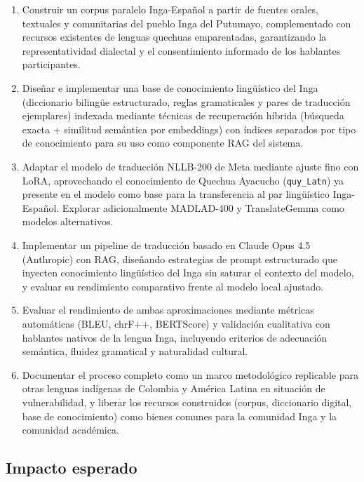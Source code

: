 \documentclass[12pt,a4paper]{article}
\begin{document}
\begin{enumerate}
    \item Construir un corpus paralelo Inga-Español a partir de fuentes orales, textuales y comunitarias del pueblo Inga del Putumayo, complementado con recursos existentes de lenguas quechuas emparentadas, garantizando la representatividad dialectal y el consentimiento informado de los hablantes participantes.

    \item Diseñar e implementar una base de conocimiento lingüístico del Inga (diccionario bilingüe estructurado, reglas gramaticales y pares de traducción ejemplares) indexada mediante técnicas de recuperación híbrida (búsqueda exacta + similitud semántica por embeddings) con índices separados por tipo de conocimiento para su uso como componente RAG del sistema.

    \item Adaptar el modelo de traducción NLLB-200 de Meta mediante ajuste fino con LoRA, aprovechando el conocimiento de Quechua Ayacucho (\texttt{quy\_Latn}) ya presente en el modelo como base para la transferencia al par lingüístico Inga-Español. Explorar adicionalmente MADLAD-400 y TranslateGemma como modelos alternativos.

    \item Implementar un pipeline de traducción basado en Claude Opus 4.5 (Anthropic) con RAG, diseñando estrategias de prompt estructurado que inyecten conocimiento lingüístico del Inga sin saturar el contexto del modelo, y evaluar su rendimiento comparativo frente al modelo local ajustado.

    \item Evaluar el rendimiento de ambas aproximaciones mediante métricas automáticas (BLEU, chrF++, BERTScore) y validación cualitativa con hablantes nativos de la lengua Inga, incluyendo criterios de adecuación semántica, fluidez gramatical y naturalidad cultural.

    \item Documentar el proceso completo como un marco metodológico replicable para otras lenguas indígenas de Colombia y América Latina en situación de vulnerabilidad, y liberar los recursos construidos (corpus, diccionario digital, base de conocimiento) como bienes comunes para la comunidad Inga y la comunidad académica.
\end{enumerate}

\subsection{Impacto esperado}
\end{document}
